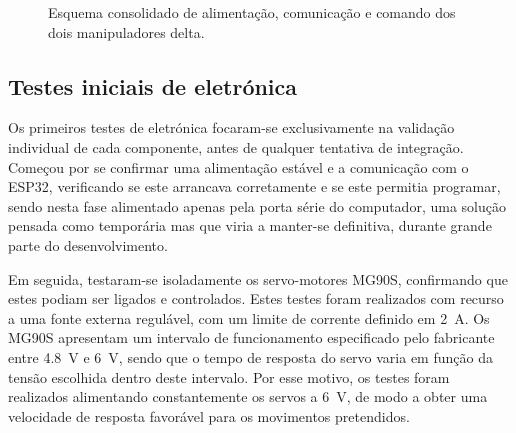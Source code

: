 \begin{figure}[H]
{}
  \caption{Esquema consolidado de alimentação, comunicação e comando dos dois manipuladores delta.}
  \label{fig:alimentacao-geral}
\end{figure}

\subsection{Testes iniciais de eletrónica}
Os primeiros testes de eletrónica focaram-se exclusivamente na validação individual de cada componente, antes de qualquer tentativa de integração. Começou por se confirmar uma alimentação estável e a comunicação com o ESP32, verificando se este arrancava corretamente e se este permitia programar, sendo nesta fase alimentado apenas pela porta série do computador, uma solução pensada como temporária mas que viria a manter-se definitiva, durante grande parte do desenvolvimento.

Em seguida, testaram-se isoladamente os servo-motores MG90S, confirmando que estes podiam ser ligados e controlados. Estes testes foram realizados com recurso a uma fonte externa regulável, com um limite de corrente definido em \SI{2}{\ampere}. Os MG90S apresentam um intervalo de funcionamento especificado pelo fabricante entre \SI{4.8}{\volt} e \SI{6}{\volt}, sendo que o tempo de resposta do servo varia em função da tensão escolhida dentro deste intervalo. Por esse motivo, os testes foram realizados alimentando constantemente os servos a \SI{6}{\volt}, de modo a obter uma velocidade de resposta favorável para os movimentos pretendidos.


